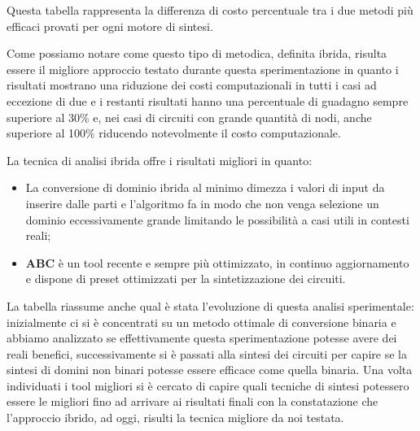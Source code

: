 \documentclass[
]{book}
\providecommand{\tightlist}{%
  \setlength{\itemsep}{0pt}\setlength{\parskip}{0pt}}
\begin{document}
\newpage

Questa tabella rappresenta la differenza di costo percentuale tra i due metodi più efficaci provati per ogni motore di sintesi.

Come possiamo notare come questo tipo di metodica, definita ibrida, risulta essere il migliore approccio testato durante questa sperimentazione in quanto i risultati mostrano una riduzione dei costi computazionali in tutti i casi ad eccezione di due e i restanti risultati hanno una percentuale di guadagno sempre superiore al 30\% e, nei casi di circuiti con grande quantità di nodi, anche superiore al 100\% riducendo notevolmente il costo computazionale.

La tecnica di analisi ibrida offre i risultati migliori in quanto:

\begin{itemize}
\tightlist
\item
  La conversione di dominio ibrida al minimo dimezza i valori di input da inserire dalle parti e l'algoritmo fa in modo che non venga selezione un dominio eccessivamente grande limitando le possibilità a casi utili in contesti reali;
\item
  \textbf{ABC} è un tool recente e sempre più ottimizzato, in continuo aggiornamento e dispone di preset ottimizzati per la sintetizzazione dei circuiti.
\end{itemize}

La tabella riassume anche qual è stata l'evoluzione di questa analisi sperimentale: inizialmente ci si è concentrati su un metodo ottimale di conversione binaria e abbiamo analizzato se effettivamente questa sperimentazione potesse avere dei reali benefici, successivamente si è passati alla sintesi dei circuiti per capire se la sintesi di domini non binari potesse essere efficace come quella binaria. Una volta individuati i tool migliori si è cercato di capire quali tecniche di sintesi potessero essere le migliori fino ad arrivare ai risultati finali con la constatazione che l'approccio ibrido, ad oggi, risulti la tecnica migliore da noi testata.

  
\end{document}
